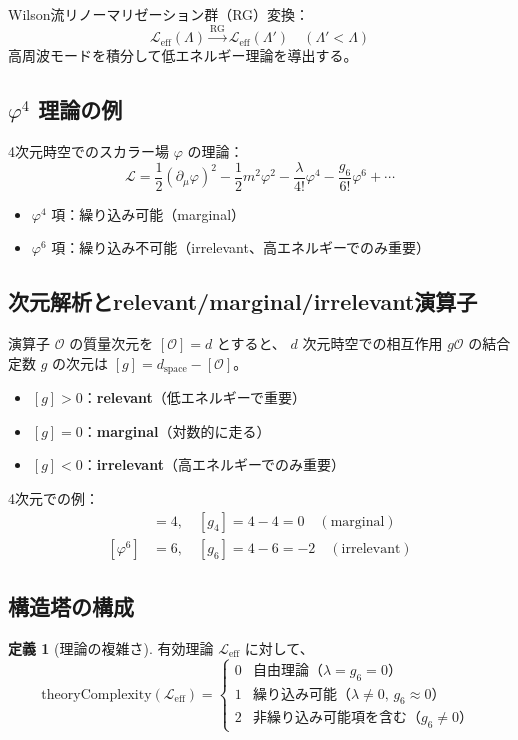 \documentclass[a4paper,12pt]{ltjsarticle}
\theoremstyle{definition}
\newtheorem{definition}[theorem]{定義}
\begin{document}
Wilson流リノーマリゼーション群（RG）変換：
\[
\mathcal{L}_{\mathrm{eff}}(\Lambda) \xrightarrow{\mathrm{RG}} \mathcal{L}_{\mathrm{eff}}(\Lambda')
\quad (\Lambda' < \Lambda)
\]
高周波モードを積分して低エネルギー理論を導出する。

\subsection{$\varphi^4$ 理論の例}

4次元時空でのスカラー場 $\varphi$ の理論：
\[
\mathcal{L} = \frac{1}{2}(\partial_\mu \varphi)^2 - \frac{1}{2}m^2\varphi^2 - \frac{\lambda}{4!}\varphi^4 - \frac{g_6}{6!}\varphi^6 + \cdots
\]

\begin{itemize}
  \item $\varphi^4$ 項：繰り込み可能（marginal）
  \item $\varphi^6$ 項：繰り込み不可能（irrelevant、高エネルギーでのみ重要）
\end{itemize}

\subsection{次元解析とrelevant/marginal/irrelevant演算子}

演算子 $\mathcal{O}$ の質量次元を $[\mathcal{O}] = d$ とすると、
$d$ 次元時空での相互作用 $g\mathcal{O}$ の結合定数 $g$ の次元は $[g] = d_{\text{space}} - [\mathcal{O}]$。

\begin{itemize}
  \item $[g] > 0$：\textbf{relevant}（低エネルギーで重要）
  \item $[g] = 0$：\textbf{marginal}（対数的に走る）
  \item $[g] < 0$：\textbf{irrelevant}（高エネルギーでのみ重要）
\end{itemize}

4次元での例：
\begin{align*}
[\varphi^4] &= 4, \quad [g_4] = 4 - 4 = 0 \quad (\text{marginal}) \\
[\varphi^6] &= 6, \quad [g_6] = 4 - 6 = -2 \quad (\text{irrelevant})
\end{align*}

\subsection{構造塔の構成}

\begin{definition}[理論の複雑さ]
有効理論 $\mathcal{L}_{\mathrm{eff}}$ に対して、
\[
\mathrm{theoryComplexity}(\mathcal{L}_{\mathrm{eff}}) =
\begin{cases}
0 & \text{自由理論（$\lambda = g_6 = 0$）} \\
1 & \text{繰り込み可能（$\lambda \neq 0$, $g_6 \approx 0$）} \\
2 & \text{非繰り込み可能項を含む（$g_6 \neq 0$）}
\end{cases}
\]
\end{definition}
\end{document}
